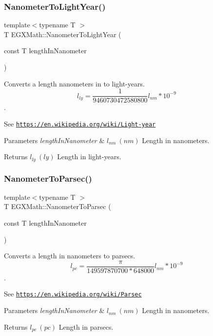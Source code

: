 \subsubsection{\texorpdfstring{Nanometer\+To\+Light\+Year()}{NanometerToLightYear()}}
{\footnotesize\ttfamily template$<$typename T $>$ \\
T E\+G\+X\+Math\+::\+Nanometer\+To\+Light\+Year (\begin{DoxyParamCaption}\item[{const T}]{length\+In\+Nanometer }\end{DoxyParamCaption})}



Converts a length nanometers in to light-\/years. \[ l_{ly}= \frac{1}{9460730472580800} l_{nm} * 10^{-9} \]. 

See \href{https://en.wikipedia.org/wiki/Light-year}{\tt https\+://en.\+wikipedia.\+org/wiki/\+Light-\/year} 
\begin{DoxyParams}{Parameters}
{\em length\+In\+Nanometer} & $ l_{nm}\ (nm)$ Length in nanometers. \\
\hline
\end{DoxyParams}
\begin{DoxyReturn}{Returns}
$ l_{ly}\ (ly)$ Length in light-\/years. 
\end{DoxyReturn}
\mbox{\label{group___e_g_x_math-_conversions-_length_conversions-_s_i-_nanometer-_astronomical_ga20e55ba8ac39aaf9b27c4092266cdcee}} 
\subsubsection{\texorpdfstring{Nanometer\+To\+Parsec()}{NanometerToParsec()}}
{\footnotesize\ttfamily template$<$typename T $>$ \\
T E\+G\+X\+Math\+::\+Nanometer\+To\+Parsec (\begin{DoxyParamCaption}\item[{const T}]{length\+In\+Nanometer }\end{DoxyParamCaption})}



Converts a length in nanometers to parsecs. \[ l_{pc}=\frac{\pi}{149597870700 * 648000} l_{nm} * 10^{-9} \]. 

See \href{https://en.wikipedia.org/wiki/Parsec}{\tt https\+://en.\+wikipedia.\+org/wiki/\+Parsec} 
\begin{DoxyParams}{Parameters}
{\em length\+In\+Nanometer} & $ l_{nm}\ (nm)$ Length in nanometers. \\
\hline
\end{DoxyParams}
\begin{DoxyReturn}{Returns}
$ l_{pc}\ (pc)$ Length in parsecs. 
\end{DoxyReturn}
